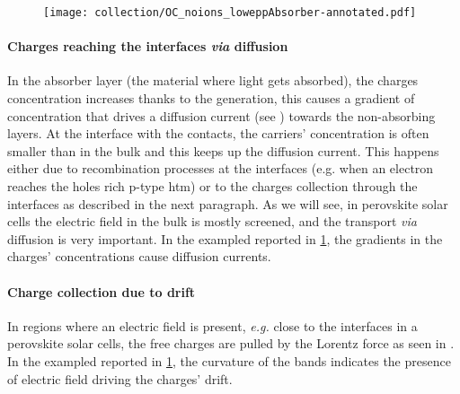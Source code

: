 	
	\begin{figure}
		\centering
		\texttt{[image: collection/OC\_noions\_loweppAbsorber-annotated.pdf]}
		\label{fig:collection}
	\end{figure}
	
		\paragraph{Charges reaching the interfaces \textsl{via} diffusion}
		In the absorber layer (the material where light gets absorbed), the charges concentration increases thanks to the generation, this causes a gradient of concentration that drives a diffusion current (see ) towards the non\hyp{}absorbing layers.
		At the interface with the contacts, the carriers' concentration is often smaller than in the bulk and this keeps up the diffusion current.
		This happens either due to recombination processes at the interfaces (e.g. when an electron reaches the holes rich p-type \gls{htm}) or to the charges collection through the interfaces as described in the next paragraph.
		As we will see, in perovskite solar cells the electric field in the bulk is mostly screened, and the transport \textsl{via} diffusion is very important.
		In the exampled reported in \cref{fig:collection}, the gradients in the charges' concentrations cause diffusion currents.
		
		\paragraph{Charge collection due to drift}
		In regions where an electric field is present, \textsl{e.g.} close to the interfaces in a perovskite solar cells, the free charges are pulled by the Lorentz force as seen in .
		In the exampled reported in \cref{fig:collection}, the curvature of the bands indicates the presence of electric field driving the charges' drift.

